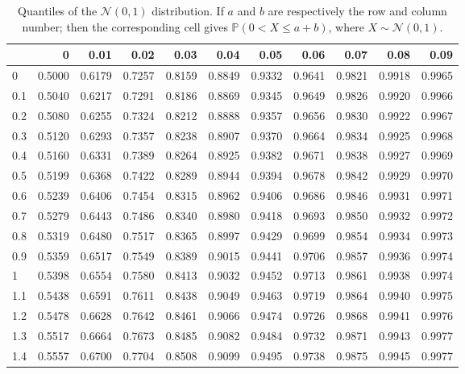\documentclass[
  11pt,
]{book}
\theoremstyle{definition}
\theoremstyle{definition}
\theoremstyle{definition}
\theoremstyle{definition}
\theoremstyle{remark}
\begin{document}
\begin{table}

\caption{\label{tab:Normal}Quantiles of the $\mathcal{N}(0,1)$ distribution. If $a$ and $b$ are respectively the row and column number; then the corresponding cell gives $\mathbb{P}(0<X\le a+b)$, where $X \sim \mathcal{N}(0,1)$.}
\centering
\begin{tabular}[t]{l|r|r|r|r|r|r|r|r|r|r}
\hline
  & 0 & 0.01 & 0.02 & 0.03 & 0.04 & 0.05 & 0.06 & 0.07 & 0.08 & 0.09\\
\hline
0 & 0.5000 & 0.6179 & 0.7257 & 0.8159 & 0.8849 & 0.9332 & 0.9641 & 0.9821 & 0.9918 & 0.9965\\
\hline
0.1 & 0.5040 & 0.6217 & 0.7291 & 0.8186 & 0.8869 & 0.9345 & 0.9649 & 0.9826 & 0.9920 & 0.9966\\
\hline
0.2 & 0.5080 & 0.6255 & 0.7324 & 0.8212 & 0.8888 & 0.9357 & 0.9656 & 0.9830 & 0.9922 & 0.9967\\
\hline
0.3 & 0.5120 & 0.6293 & 0.7357 & 0.8238 & 0.8907 & 0.9370 & 0.9664 & 0.9834 & 0.9925 & 0.9968\\
\hline
0.4 & 0.5160 & 0.6331 & 0.7389 & 0.8264 & 0.8925 & 0.9382 & 0.9671 & 0.9838 & 0.9927 & 0.9969\\
\hline
0.5 & 0.5199 & 0.6368 & 0.7422 & 0.8289 & 0.8944 & 0.9394 & 0.9678 & 0.9842 & 0.9929 & 0.9970\\
\hline
0.6 & 0.5239 & 0.6406 & 0.7454 & 0.8315 & 0.8962 & 0.9406 & 0.9686 & 0.9846 & 0.9931 & 0.9971\\
\hline
0.7 & 0.5279 & 0.6443 & 0.7486 & 0.8340 & 0.8980 & 0.9418 & 0.9693 & 0.9850 & 0.9932 & 0.9972\\
\hline
0.8 & 0.5319 & 0.6480 & 0.7517 & 0.8365 & 0.8997 & 0.9429 & 0.9699 & 0.9854 & 0.9934 & 0.9973\\
\hline
0.9 & 0.5359 & 0.6517 & 0.7549 & 0.8389 & 0.9015 & 0.9441 & 0.9706 & 0.9857 & 0.9936 & 0.9974\\
\hline
1 & 0.5398 & 0.6554 & 0.7580 & 0.8413 & 0.9032 & 0.9452 & 0.9713 & 0.9861 & 0.9938 & 0.9974\\
\hline
1.1 & 0.5438 & 0.6591 & 0.7611 & 0.8438 & 0.9049 & 0.9463 & 0.9719 & 0.9864 & 0.9940 & 0.9975\\
\hline
1.2 & 0.5478 & 0.6628 & 0.7642 & 0.8461 & 0.9066 & 0.9474 & 0.9726 & 0.9868 & 0.9941 & 0.9976\\
\hline
1.3 & 0.5517 & 0.6664 & 0.7673 & 0.8485 & 0.9082 & 0.9484 & 0.9732 & 0.9871 & 0.9943 & 0.9977\\
\hline
1.4 & 0.5557 & 0.6700 & 0.7704 & 0.8508 & 0.9099 & 0.9495 & 0.9738 & 0.9875 & 0.9945 & 0.9977\\

\end{tabular}
\end{table}
\end{document}
